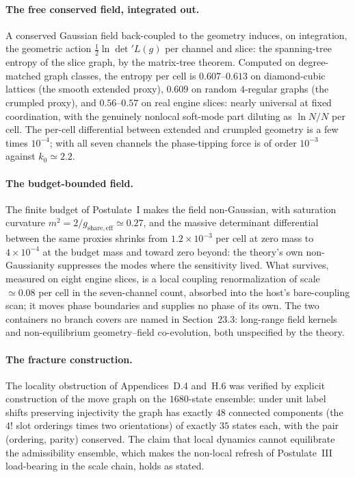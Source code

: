 \documentclass[11pt]{article}
\begin{document}
\paragraph{The free conserved field, integrated out.} A conserved Gaussian field back-coupled to the geometry induces, on integration, the geometric action $\tfrac{1}{2}\ln\det'L(g)$ per channel and slice: the spanning-tree entropy of the slice graph, by the matrix-tree theorem. Computed on degree-matched graph classes, the entropy per cell is $0.607$--$0.613$ on diamond-cubic lattices (the smooth extended proxy), $0.609$ on random $4$-regular graphs (the crumpled proxy), and $0.56$--$0.57$ on real engine slices: nearly universal at fixed coordination, with the genuinely nonlocal soft-mode part diluting as $\ln N/N$ per cell. The per-cell differential between extended and crumpled geometry is a few times $10^{-4}$; with all seven channels the phase-tipping force is of order $10^{-3}$ against $k_0\simeq2.2$.

\paragraph{The budget-bounded field.} The finite budget of Postulate~I makes the field non-Gaussian, with saturation curvature $m^2=2/g_{\mathrm{share,eff}}\simeq0.27$, and the massive determinant differential between the same proxies shrinks from $1.2\times10^{-3}$ per cell at zero mass to $4\times10^{-4}$ at the budget mass and toward zero beyond: the theory's own non-Gaussianity suppresses the modes where the sensitivity lived. What survives, measured on eight engine slices, is a local coupling renormalization of scale $\simeq0.08$ per cell in the seven-channel count, absorbed into the host's bare-coupling scan; it moves phase boundaries and supplies no phase of its own. The two containers no branch covers are named in Section~23.3: long-range field kernels and non-equilibrium geometry--field co-evolution, both unspecified by the theory.

\paragraph{The fracture construction.} The locality obstruction of Appendices~D.4 and~H.6 was verified by explicit construction of the move graph on the $1680$-state ensemble: under unit label shifts preserving injectivity the graph has exactly $48$ connected components (the $4!$ slot orderings times two orientations) of exactly $35$ states each, with the pair (ordering, parity) conserved. The claim that local dynamics cannot equilibrate the admissibility ensemble, which makes the non-local refresh of Postulate~III load-bearing in the scale chain, holds as stated.
\end{document}
